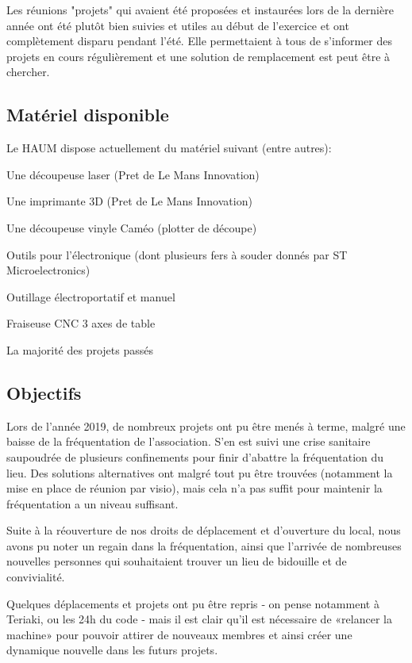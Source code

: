 \documentclass[11pt]{article}
\begin{document}
Les réunions "projets" qui avaient été proposées et instaurées lors de la dernière année
ont été plutôt bien suivies et utiles au début de l'exercice et ont complètement disparu
pendant l'été. Elle permettaient à tous de s'informer des projets en cours régulièrement
et une solution de remplacement est peut être à chercher.

\subsection{Matériel disponible}

Le HAUM dispose actuellement du matériel suivant (entre autres):

\begin{description}
    \item Une découpeuse laser (Pret de Le Mans Innovation)
    \item Une imprimante 3D (Pret de Le Mans Innovation)
    \item Une découpeuse vinyle Caméo (plotter de découpe)
    \item Outils pour l'électronique (dont plusieurs fers à souder donnés par ST Microelectronics)
    \item Outillage électroportatif et manuel
    \item Fraiseuse CNC 3 axes de table
    \item La majorité des projets passés
\end{description}

\subsection{Objectifs}

Lors de l'année 2019, de nombreux projets ont pu être menés à terme, malgré une baisse de la
fréquentation de l'association. S'en est suivi une crise sanitaire saupoudrée de plusieurs 
confinements pour finir d'abattre la fréquentation du lieu. Des solutions alternatives ont 
malgré tout pu être trouvées (notamment la mise en place de réunion par visio), mais cela 
n'a pas suffit pour maintenir la fréquentation a un niveau suffisant.

Suite à la réouverture de nos droits de déplacement et d'ouverture du local, nous avons pu
noter un regain dans la fréquentation, ainsi que l'arrivée de nombreuses nouvelles personnes
qui souhaitaient trouver un lieu de bidouille et de convivialité.

Quelques déplacements et projets ont pu être repris ‑ on pense notamment à Teriaki, ou les 
24h du code ‑ mais il est clair qu'il est nécessaire de «relancer la machine» pour pouvoir 
attirer de nouveaux membres et ainsi créer une dynamique nouvelle dans les futurs projets.
\end{document}

